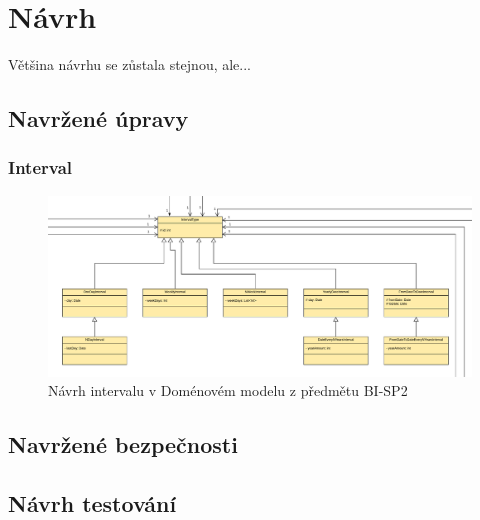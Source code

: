 \chapter{Návrh}
Většina návrhu se zůstala stejnou, ale...
\section{Navržené úpravy}\label{navrh:upravy}
    \subsection{Interval}\label{narh:upravy:interval}
    \begin{figure}\centering
	    \includegraphics[width=1.0\textwidth]{pdfs/Interval1}
	    \caption[Návrh intervalu]{Návrh intervalu v Doménovém modelu z předmětu BI-SP2}\label{image:Interval1}
    \end{figure}
\section{Navržené bezpečnosti}\label{navrh:bezpecnost}
\section{Návrh testování}\label{navrh:testovani}